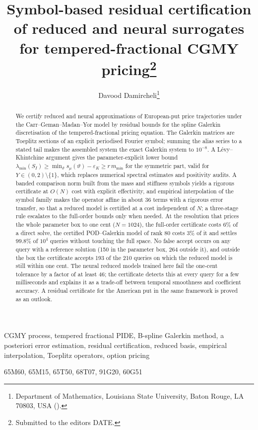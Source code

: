 \documentclass[hidelinks]{siamart251216}
\title{Symbol-based residual certification of reduced and neural surrogates for tempered-fractional CGMY pricing\thanks{Submitted to the editors DATE.}}
\author{Davood Damircheli\thanks{Department of Mathematics, Louisiana State University, Baton Rouge, LA 70803, USA
(\email{ddamircheli@lsu.edu}).}}
\begin{document}
\maketitle
\begin{abstract}
We certify reduced and neural approximations of European-put price trajectories under the
Carr--Geman--Madan--Yor model by residual bounds for the spline Galerkin discretisation of the
tempered-fractional pricing equation.  The Galerkin matrices are Toeplitz sections of an explicit
periodised Fourier symbol; summing the alias series to a stated tail makes the assembled system
the exact Galerkin system to $10^{-8}$.  A L\'evy--Khintchine argument gives the parameter-explicit
lower bound $\lambda_{\min}(S_I)\ge\min_\vartheta s_\mu(\vartheta)-\varepsilon_K\ge r\,m_{\min}$ for
the symmetric part, valid for $Y\in(0,2)\setminus\{1\}$, which replaces numerical spectral estimates
and positivity audits.  A banded comparison norm built from the mass and stiffness symbols yields a
rigorous certificate at $O(N)$ cost with explicit effectivity, and empirical interpolation of the
symbol family makes the operator affine in about 36 terms with a rigorous error transfer, so that a
reduced model is certified at a cost independent of $N$; a three-stage rule escalates to the
full-order bounds only when needed.  At the resolution that prices the whole parameter box to one
cent ($N=1024$), the full-order certificate costs $6\%$ of a direct solve, the certified
POD--Galerkin model of rank $80$ costs $3\%$ of it and settles $99.8\%$ of $10^4$ queries without
touching the full space.  No false accept occurs on any query with a reference solution (150 in
the parameter box, 264 outside it), and outside the box the certificate accepts 193 of the 210
queries on which the reduced model is still within one cent.  The neural
reduced models trained here fail the one-cent tolerance by a factor of at least $46$; the certificate
detects this at every query for a few milliseconds and explains it as a trade-off between
temporal smoothness and coefficient accuracy.  A residual certificate for the American put
in the same framework is proved as an outlook.
\end{abstract}
\begin{keywords}
CGMY process, tempered fractional PIDE, B-spline Galerkin method, a posteriori error estimation,
residual certification, reduced basis, empirical interpolation, Toeplitz operators, option pricing
\end{keywords}
\begin{MSCcodes}
65M60, 65M15, 65T50, 68T07, 91G20, 60G51
\end{MSCcodes}
\end{document}
